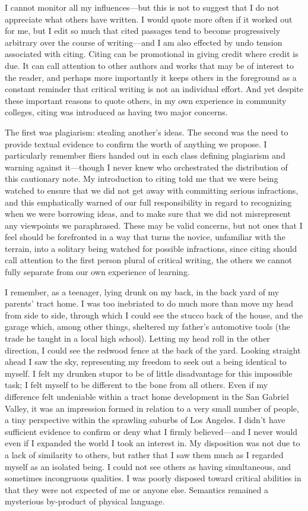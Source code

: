 \documentclass[
]{memoir}
\begin{document}
I cannot monitor all my influences---but this is not to suggest that I
do not appreciate what others have written. I would quote more often if
it worked out for me, but I edit so much that cited passages tend to
become progressively arbitrary over the course of writing---and I am
also effected by undo tension associated with citing. Citing can be
promotional in giving credit where credit is due. It can call attention
to other authors and works that may be of interest to the reader, and
perhaps more importantly it keeps others in the foreground as a constant
reminder that critical writing is not an individual effort. And yet
despite these important reasons to quote others, in my own experience in
community colleges, citing was introduced as having two major concerns.

The first was plagiarism: stealing another's ideas. The second was the
need to provide textual evidence to confirm the worth of anything we
propose. I particularly remember fliers handed out in each class
defining plagiarism and warning against it---though I never knew who
orchestrated the distribution of this cautionary note. My introduction
to citing told me that we were being watched to ensure that we did not
get away with committing serious infractions, and this emphatically
warned of our full responsibility in regard to recognizing when we were
borrowing ideas, and to make sure that we did not misrepresent any
viewpoints we paraphrased. These may be valid concerns, but not ones
that I feel should be forefronted in a way that turns the novice,
unfamiliar with the terrain, into a solitary being watched for possible
infractions, since citing should call attention to the first person
plural of critical writing, the others we cannot fully separate from our
own experience of learning.

I remember, as a teenager, lying drunk on my back, in the back yard of
my parents' tract home. I was too inebriated to do much more than move
my head from side to side, through which I could see the stucco back of
the house, and the garage which, among other things, sheltered my
father's automotive tools (the trade he taught in a local high school).
Letting my head roll in the other direction, I could see the redwood
fence at the back of the yard. Looking straight ahead I saw the sky,
representing my freedom to seek out a being identical to myself. I felt
my drunken stupor to be of little disadvantage for this impossible task;
I felt myself to be different to the bone from all others. Even if my
difference felt undeniable within a tract home development in the San
Gabriel Valley, it was an impression formed in relation to a very small
number of people, a tiny perspective within the sprawling suburbs of Los
Angeles. I didn't have sufficient evidence to confirm or deny what I
firmly believed---and I never would even if I expanded the world I took
an interest in. My disposition was not due to a lack of similarity to
others, but rather that I saw them much as I regarded myself as an
isolated being. I could not see others as having simultaneous, and
sometimes incongruous qualities. I was poorly disposed toward critical
abilities in that they were not expected of me or anyone else. Semantics
remained a mysterious by-product of physical language.
\end{document}
